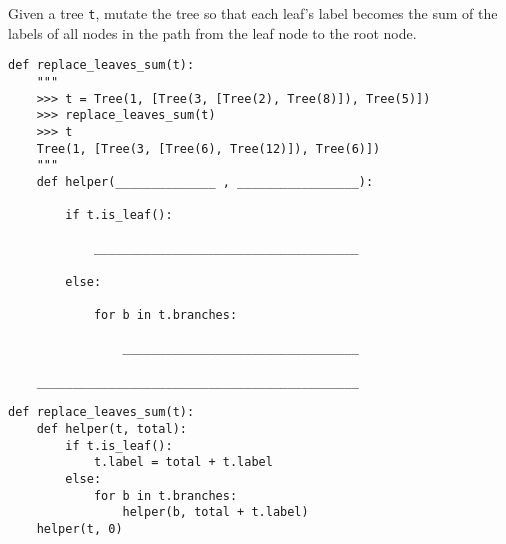 \begin{blocksection}
\question Given a tree \texttt{t}, mutate the tree so that each leaf's label becomes the sum of the labels of all nodes in the path from the leaf node to the root node. 
\end{blocksection}

\begin{lstlisting}
def replace_leaves_sum(t):
    """
    >>> t = Tree(1, [Tree(3, [Tree(2), Tree(8)]), Tree(5)])
    >>> replace_leaves_sum(t)
    >>> t
    Tree(1, [Tree(3, [Tree(6), Tree(12)]), Tree(6)])
    """
    def helper(______________ , _________________):

        if t.is_leaf():

            _____________________________________

        else:

            for b in t.branches:

                _________________________________

    _____________________________________________
\end{lstlisting}

\begin{solution}
\begin{lstlisting}
def replace_leaves_sum(t):
    def helper(t, total):
        if t.is_leaf():
            t.label = total + t.label
        else:
            for b in t.branches:
                helper(b, total + t.label)
    helper(t, 0)
\end{lstlisting}
\end{solution}
